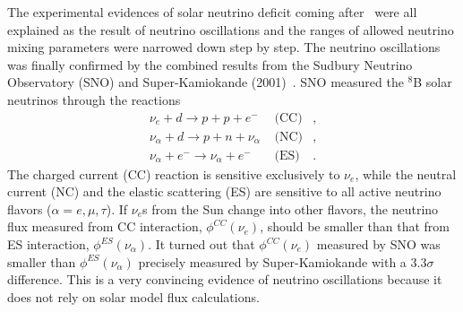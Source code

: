 The experimental evidences of solar neutrino deficit coming
after~\cite{Hir89,Aba91,Ans92} were all explained as the result of
neutrino oscillations and the ranges of allowed neutrino mixing
parameters were narrowed down step by step. The neutrino oscillations
was finally confirmed by the combined results from the Sudbury
Neutrino Observatory (SNO) and Super-Kamiokande
(2001)~\cite{Ahm01,Fuk01}. SNO measured the $^8$B solar neutrinos
through the reactions
\begin{eqnarray*}
  \nu_e + d \rightarrow p + p + e^- &\mbox{\ \ \ \ \ \ (CC)}&,\\
  \nu_\alpha + d \rightarrow p + n + \nu_\alpha &\mbox{\ \ \ \ \ \    
(NC)}&,\\
  \nu_\alpha + e^- \rightarrow \nu_\alpha + e^- &\mbox{\ \ \ \ \ \    
(ES)}&.
\end{eqnarray*}
The charged current (CC) reaction is sensitive exclusively to $\nu_e$,
while the neutral current (NC) and the elastic scattering (ES) are
sensitive to all active neutrino flavors ($\alpha = e, \mu, \tau$). If
$\nu_e$s from the Sun change into other flavors, the neutrino flux
measured from CC interaction, $\phi^{CC}(\nu_e)$, should be smaller
than that from ES interaction, $\phi^{ES}(\nu_\alpha)$. It turned out
that $\phi^{CC}(\nu_e)$ measured by SNO was smaller than
$\phi^{ES}(\nu_\alpha)$ precisely measured by Super-Kamiokande with a
$3.3\sigma$ difference. This is a very convincing evidence of neutrino
oscillations because it does not rely on solar model flux
calculations.

